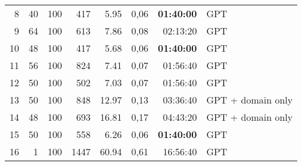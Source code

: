 \begin{table}[!ht]
\begin{tabular}{rrrrrrrl}
    8                     & 40                    & 100                          & 417                    & 5.95              & 0,06                               & \textbf{01:40:00}                              & GPT                                                      \\
    9                     & 64                    & 100                          & 613                    & 7.86              & 0,08                               & 02:13:20                                       & GPT                                                      \\
    10                    & 48                    & 100                          & 417                    & 5.68              & 0,06                               & \textbf{01:40:00}                              & GPT                                                      \\
    11                    & 56                    & 100                          & 824                    & 7.41              & 0,07                               & 01:56:40                                       & GPT                                                      \\
    12                    & 50                    & 100                          & 502                    & 7.03              & 0,07                               & 01:56:40                                       & GPT                                                      \\
    13                    & 50                    & 100                          & 848                    & 12.97             & 0,13                               & 03:36:40                                       & GPT + domain only                                        \\
    14                    & 48                    & 100                          & 693                    & 16.81             & 0,17                               & 04:43:20                                       & GPT + domain only                                        \\
    15                    & 50                    & 100                          & 558                    & 6.26              & 0,06                               & \textbf{01:40:00}                              & GPT                                                      \\
    16                    & 1                     & 100                          & 1447                   & 60.94             & 0,61                               & 16:56:40                                       & GPT                                                      \\

\end{tabular}
\end{table}

